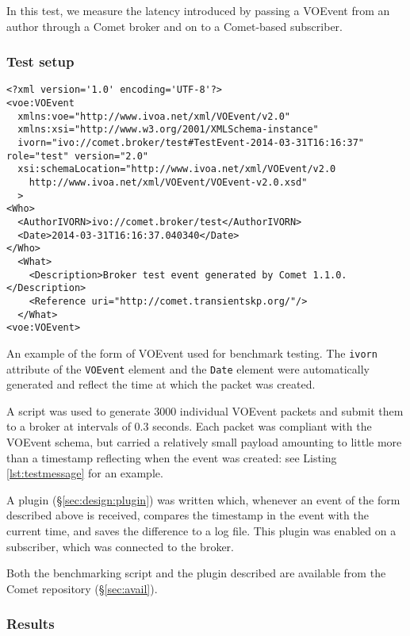 \documentclass[5p,authoryear]{elsarticle}
\begin{document}
In this test, we measure the latency introduced by passing a VOEvent from an
author through a Comet broker and on to a Comet-based subscriber.

\subsubsection{Test setup}
\label{sec:perf:latency:setup}

\begin{listing*}
\begin{verbatim}
<?xml version='1.0' encoding='UTF-8'?>
<voe:VOEvent
  xmlns:voe="http://www.ivoa.net/xml/VOEvent/v2.0"
  xmlns:xsi="http://www.w3.org/2001/XMLSchema-instance"
  ivorn="ivo://comet.broker/test#TestEvent-2014-03-31T16:16:37" role="test" version="2.0"
  xsi:schemaLocation="http://www.ivoa.net/xml/VOEvent/v2.0
    http://www.ivoa.net/xml/VOEvent/VOEvent-v2.0.xsd"
  >
<Who>
  <AuthorIVORN>ivo://comet.broker/test</AuthorIVORN>
  <Date>2014-03-31T16:16:37.040340</Date>
</Who>
  <What>
    <Description>Broker test event generated by Comet 1.1.0.</Description>
    <Reference uri="http://comet.transientskp.org/"/>
  </What>
<voe:VOEvent>
\end{verbatim}
\caption{An example of the form of VOEvent used for benchmark testing. The
\texttt{ivorn} attribute of the \texttt{VOEvent} element and the \texttt{Date}
element were automatically generated and reflect the time at which the packet
was created.}
\label{lst:testmessage}
\end{listing*}

A script was used to generate 3000 individual VOEvent packets and submit them
to a broker at intervals of 0.3 seconds.  Each packet was compliant with the
VOEvent schema, but carried a relatively small payload amounting to little
more than a timestamp reflecting when the event was created: see Listing
\ref{lst:testmessage} for an example.

A plugin (\S\ref{sec:design:plugin}) was written which, whenever an event of
the form described above is received, compares the timestamp in the event with
the current time, and saves the difference to a log file. This plugin was
enabled on a subscriber, which was connected to the broker.

Both the benchmarking script and the plugin described are available from the
Comet repository (\S\ref{sec:avail}).

\subsubsection{Results}
\label{sec:perf:latency:results}
\end{document}
